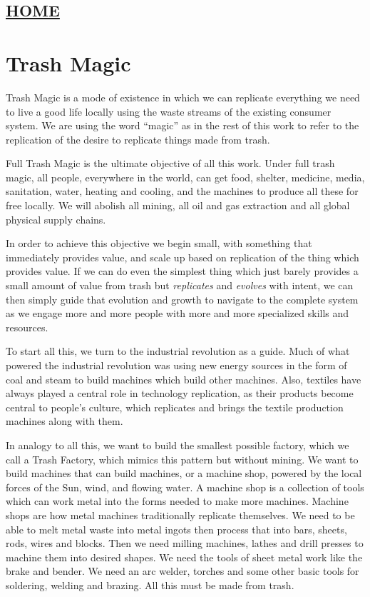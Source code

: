 \hypertarget{home}{%
\subsection{\texorpdfstring{\href{scrolls/home}{HOME}}{HOME}}\label{home}}

\hypertarget{trash-magic}{%
\section{Trash Magic}\label{trash-magic}}

Trash Magic is a mode of existence in which we can replicate everything
we need to live a good life locally using the waste streams of the
existing consumer system. We are using the word ``magic'' as in the rest
of this work to refer to the replication of the desire to replicate
things made from trash.

Full Trash Magic is the ultimate objective of all this work. Under full
trash magic, all people, everywhere in the world, can get food, shelter,
medicine, media, sanitation, water, heating and cooling, and the
machines to produce all these for free locally. We will abolish all
mining, all oil and gas extraction and all global physical supply
chains.

In order to achieve this objective we begin small, with something that
immediately provides value, and scale up based on replication of the
thing which provides value. If we can do even the simplest thing which
just barely provides a small amount of value from trash but
\emph{replicates} and \emph{evolves} with intent, we can then simply
guide that evolution and growth to navigate to the complete system as we
engage more and more people with more and more specialized skills and
resources.

To start all this, we turn to the industrial revolution as a guide. Much
of what powered the industrial revolution was using new energy sources
in the form of coal and steam to build machines which build other
machines. Also, textiles have always played a central role in technology
replication, as their products become central to people's culture, which
replicates and brings the textile production machines along with them.

In analogy to all this, we want to build the smallest possible factory,
which we call a Trash Factory, which mimics this pattern but without
mining. We want to build machines that can build machines, or a machine
shop, powered by the local forces of the Sun, wind, and flowing water. A
machine shop is a collection of tools which can work metal into the
forms needed to make more machines. Machine shops are how metal machines
traditionally replicate themselves. We need to be able to melt metal
waste into metal ingots then process that into bars, sheets, rods, wires
and blocks. Then we need milling machines, lathes and drill presses to
machine them into desired shapes. We need the tools of sheet metal work
like the brake and bender. We need an arc welder, torches and some other
basic tools for soldering, welding and brazing. All this must be made
from trash.

